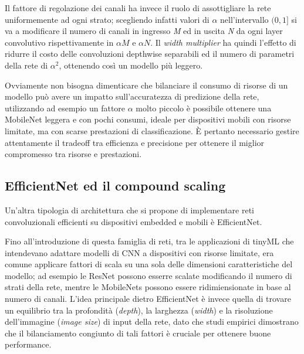 Il fattore di regolazione dei canali ha invece il ruolo di assottigliare la rete uniformemente ad ogni strato; scegliendo infatti valori di $\alpha$ nell'intervallo $(0, 1]$ si va a modificare il numero di canali in ingresso \textit{M} ed in uscita \textit{N} da ogni layer convolutivo rispettivamente in $\alpha M$ e $\alpha N$. Il \textit{width multiplier} ha quindi l'effetto di ridurre il costo delle convoluzioni depthwise separabili ed il numero di parametri della rete di $\alpha^{2}$, ottenendo così un modello più leggero. 


Ovviamente non bisogna dimenticare che bilanciare il consumo di risorse di un modello può avere un impatto sull'accuratezza di predizione della rete, utilizzando ad esempio un fattore $\alpha$ molto piccolo è possibile ottenere una MobileNet leggera e con pochi consumi, ideale per dispositivi mobili con risorse limitate, ma con scarse prestazioni di classificazione. È pertanto necessario gestire attentamente il tradeoff tra efficienza e precisione per ottenere il miglior compromesso tra risorse e prestazioni.

\subsection{EfficientNet ed il compound scaling}

Un'altra tipologia di architettura che si propone di implementare reti convoluzionali efficienti su dispositivi embedded e mobili è EfficientNet.

Fino all'introduzione di questa famiglia di reti, tra le applicazioni di tinyML che intendevano adattare modelli di CNN a dispositivi con risorse limitate, era comune applicare fattori di scala su una sola delle dimensioni caratteristiche del modello; ad esempio le ResNet \cite{ResNet} possono esserre scalate modificando il numero di strati della rete, mentre le MobileNets possono essere ridimiensionate in base al numero di canali.
L'idea principale dietro EfficientNet è invece quella di trovare un equilibrio tra la profondità (\textit{depth}), la larghezza (\textit{width}) e la risoluzione dell'immagine (\textit{image size}) di input della rete, dato che studi empirici dimostrano che il bilanciamento congiunto di tali fattori è cruciale per ottenere buone performance. 

